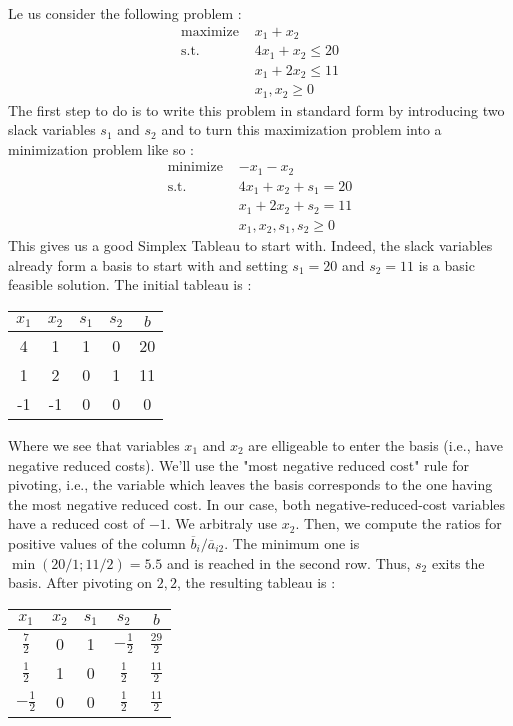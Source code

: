 Le us consider the following problem :
\begin{align*}
    \textrm{maximize } & x_1 + x_2\\
    \textrm{s.t. } & 4x_1 + x_2 \le 20\\
    & x_1 + 2x_2 \le 11\\
    & x_1, x_2\ge 0
\end{align*}
The first step to do is to write this problem in standard form by introducing two slack variables $s_1$ and $s_2$ and to turn this maximization problem into a minimization problem like so :
\begin{align*}
    \textrm{minimize } & -x_1 - x_2\\
    \textrm{s.t. } & 4x_1 + x_2 + s_1 = 20\\
    & x_1 + 2x_2 + s_2 = 11\\
    & x_1, x_2, s_1, s_2\ge 0
\end{align*}
This gives us a good Simplex Tableau to start with. Indeed, the slack variables already form a basis to start with and setting $s_1 = 20$ and $s_2 = 11$ is a basic feasible solution. The initial tableau is :
\begin{center}
    \begin{tabular}{cccc|c}
        $x_1$ & $x_2$ & $s_1$ & $s_2$ & $b$ \\\hline
        4 & 1 & 1 & 0 & 20\\
        1 & 2 & 0 & 1 & 11\\\hline
        -1 & -1 & 0 & 0 & 0
    \end{tabular}
\end{center}
Where we see that variables $x_1$ and $x_2$ are elligeable to enter the basis (i.e., have negative reduced costs). We'll use the "most negative reduced cost" rule for pivoting, i.e., the variable which leaves the basis corresponds to the one having the most negative reduced cost. In our case, both negative-reduced-cost variables have a reduced cost of $-1$. We arbitraly use $x_2$. Then, we compute the ratios for positive values of the column $\overline b_i / \overline a_{i2}$. The minimum one is $\min(20/1 ; 11/2) = 5.5$ and is reached in the second row. Thus, $s_2$ exits the basis. After pivoting on $2,2$, the resulting tableau is :
\begin{center}
    \begin{tabular}{cccc|c}
        $x_1$ & $x_2$ & $s_1$ & $s_2$ & $b$ \\\hline
        $\frac 72$ & 0 & 1 & $-\frac 12$ & $\frac{29}2$\\
        $\frac 12$ & 1 & 0 & $\frac 12$ & $\frac{11}2$\\\hline
        $-\frac 12$ & 0 & 0 & $\frac 12$ & $\frac{11}2$
    \end{tabular}
\end{center}
